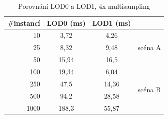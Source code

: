 \begin{table}[here]
\centering
\begin{tabular}{|r | c | c | l |} 
\hline 
\#instancí & LOD0 (ms)& LOD1 (ms)& \\ [0.5ex] 
\hline
10	&	3,72	&	4,26	& 	\multirow{3}{*}{scéna A}\\
25	&	8,32	&	9,48	&	 \\
50	&	15,94	&	16,5	&	 \\
\hline
100	& 	19,34	&	6,04	&	\multirow{4}{*}{scéna B}\\
250	& 	47,5		&	14,36	&\\
500	& 	94,2 	& 	28,58	&\\
1000 & 	188,3 	& 	55,87	&\\
 [1ex] 
\hline 
\end{tabular}
\label{table:lod01-4MS}
\caption{Porovnání LOD0 a LOD1, 4x multisampling}
\end{table}


